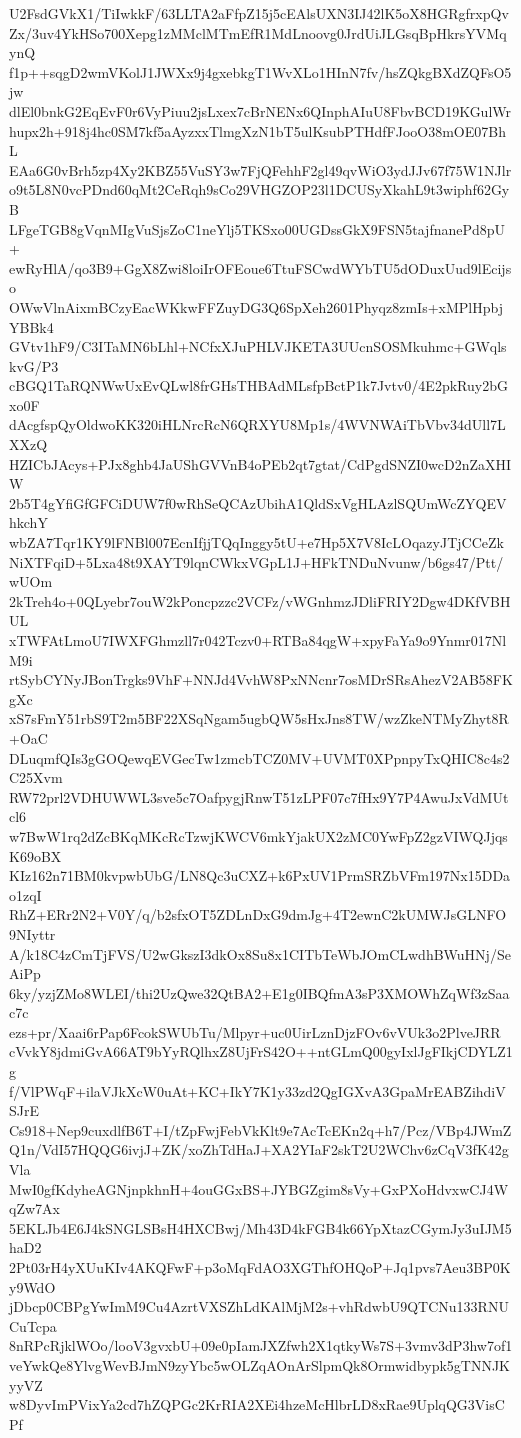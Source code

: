 U2FsdGVkX1/TiIwkkF/63LLTA2aFfpZ15j5cEAlsUXN3IJ42lK5oX8HGRgfrxpQv
Zx/3uv4YkHSo700Xepg1zMMclMTmEfR1MdLnoovg0JrdUiJLGsqBpHkrsYVMqynQ
f1p++sqgD2wmVKolJ1JWXx9j4gxebkgT1WvXLo1HInN7fv/hsZQkgBXdZQFsO5jw
dlEl0bnkG2EqEvF0r6VyPiuu2jsLxex7cBrNENx6QInphAIuU8FbvBCD19KGulWr
hupx2h+918j4hc0SM7kf5aAyzxxTlmgXzN1bT5ulKsubPTHdfFJooO38mOE07BhL
EAa6G0vBrh5zp4Xy2KBZ55VuSY3w7FjQFehhF2gl49qvWiO3ydJJv67f75W1NJlr
o9t5L8N0vcPDnd60qMt2CeRqh9sCo29VHGZOP23l1DCUSyXkahL9t3wiphf62GyB
LFgeTGB8gVqnMIgVuSjsZoC1neYlj5TKSxo00UGDssGkX9FSN5tajfnanePd8pU+
ewRyHlA/qo3B9+GgX8Zwi8loiIrOFEoue6TtuFSCwdWYbTU5dODuxUud9lEcijso
OWwVlnAixmBCzyEacWKkwFFZuyDG3Q6SpXeh2601Phyqz8zmIs+xMPlHpbjYBBk4
GVtv1hF9/C3ITaMN6bLhl+NCfxXJuPHLVJKETA3UUcnSOSMkuhmc+GWqlskvG/P3
cBGQ1TaRQNWwUxEvQLwl8frGHsTHBAdMLsfpBctP1k7Jvtv0/4E2pkRuy2bGxo0F
dAcgfspQyOldwoKK320iHLNrcRcN6QRXYU8Mp1s/4WVNWAiTbVbv34dUll7LXXzQ
HZICbJAcys+PJx8ghb4JaUShGVVnB4oPEb2qt7gtat/CdPgdSNZI0wcD2nZaXHIW
2b5T4gYfiGfGFCiDUW7f0wRhSeQCAzUbihA1QldSxVgHLAzlSQUmWcZYQEVhkchY
wbZA7Tqr1KY9lFNBl007EcnIfjjTQqInggy5tU+e7Hp5X7V8IcLOqazyJTjCCeZk
NiXTFqiD+5Lxa48t9XAYT9lqnCWkxVGpL1J+HFkTNDuNvunw/b6gs47/Ptt/wUOm
2kTreh4o+0QLyebr7ouW2kPoncpzzc2VCFz/vWGnhmzJDliFRIY2Dgw4DKfVBHUL
xTWFAtLmoU7IWXFGhmzll7r042Tczv0+RTBa84qgW+xpyFaYa9o9Ynmr017NlM9i
rtSybCYNyJBonTrgks9VhF+NNJd4VvhW8PxNNcnr7osMDrSRsAhezV2AB58FKgXc
xS7sFmY51rbS9T2m5BF22XSqNgam5ugbQW5sHxJns8TW/wzZkeNTMyZhyt8R+OaC
DLuqmfQIs3gGOQewqEVGecTw1zmcbTCZ0MV+UVMT0XPpnpyTxQHIC8c4s2C25Xvm
RW72prl2VDHUWWL3sve5c7OafpygjRnwT51zLPF07c7fHx9Y7P4AwuJxVdMUtcl6
w7BwW1rq2dZcBKqMKcRcTzwjKWCV6mkYjakUX2zMC0YwFpZ2gzVIWQJjqsK69oBX
KIz162n71BM0kvpwbUbG/LN8Qc3uCXZ+k6PxUV1PrmSRZbVFm197Nx15DDao1zqI
RhZ+ERr2N2+V0Y/q/b2sfxOT5ZDLnDxG9dmJg+4T2ewnC2kUMWJsGLNFO9NIyttr
A/k18C4zCmTjFVS/U2wGkszI3dkOx8Su8x1CITbTeWbJOmCLwdhBWuHNj/SeAiPp
6ky/yzjZMo8WLEI/thi2UzQwe32QtBA2+E1g0IBQfmA3sP3XMOWhZqWf3zSaac7c
ezs+pr/Xaai6rPap6FcokSWUbTu/Mlpyr+uc0UirLznDjzFOv6vVUk3o2PlveJRR
cVvkY8jdmiGvA66AT9bYyRQlhxZ8UjFrS42O++ntGLmQ00gyIxlJgFIkjCDYLZ1g
f/VlPWqF+ilaVJkXcW0uAt+KC+IkY7K1y33zd2QgIGXvA3GpaMrEABZihdiVSJrE
Cs918+Nep9cuxdlfB6T+I/tZpFwjFebVkKlt9e7AcTcEKn2q+h7/Pcz/VBp4JWmZ
Q1n/VdI57HQQG6ivjJ+ZK/xoZhTdHaJ+XA2YIaF2skT2U2WChv6zCqV3fK42gVla
MwI0gfKdyheAGNjnpkhnH+4ouGGxBS+JYBGZgim8sVy+GxPXoHdvxwCJ4WqZw7Ax
5EKLJb4E6J4kSNGLSBsH4HXCBwj/Mh43D4kFGB4k66YpXtazCGymJy3uIJM5haD2
2Pt03rH4yXUuKIv4AKQFwF+p3oMqFdAO3XGThfOHQoP+Jq1pvs7Aeu3BP0Ky9WdO
jDbcp0CBPgYwImM9Cu4AzrtVXSZhLdKAlMjM2s+vhRdwbU9QTCNu133RNUCuTcpa
8nRPcRjklWOo/looV3gvxbU+09e0pIamJXZfwh2X1qtkyWs7S+3vmv3dP3hw7of1
veYwkQe8YlvgWevBJmN9zyYbc5wOLZqAOnArSlpmQk8Ormwidbypk5gTNNJKyyVZ
w8DyvImPVixYa2cd7hZQPGc2KrRIA2XEi4hzeMcHlbrLD8xRae9UplqQG3VisCPf
